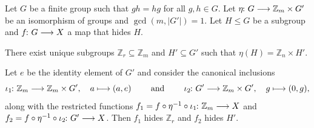 \documentclass[a4paper, oneside, 12pt]{amsart}
\begin{document}
\begin{corollary}\label{cor:abelian-vs-cyclic-hsps}
  Let \(G\) be a finite group such that \(gh=hg\) for all \(g,h\in G\).
  Let \(\eta \from G \to \mathbb{Z}_{m}\times G'\) be an isomorphism of groups and  \(\gcd(m, |G'|) = 1\).
  Let \(H \leq G\) be a subgroup and \(f \from G \to X\) a map that hides \(H\).
  \begin{thmlist}
    \item There exist unique subgroups \( \mathbb{Z}_{r} \subseteq \mathbb{Z}_{m}\) and \(H' \subseteq G'\) such that \(\eta(H) = \mathbb{Z}_{n} \times H'\).
    \item Let \(e\) be the identity element of \(G'\) and consider the canonical inclusions
    \begin{equation*}
      \iota_{1} \from \mathbb{Z}_{m} \to \mathbb{Z}_{m} \times G',\quad a \mapsto (a,e)\qquad \text{ and }\qquad
      \iota_{2} \from G' \to \mathbb{Z}_{m}\times G', \quad g \mapsto (0,g),
    \end{equation*}
    along with the restricted functions \(f_{1} = f \circ \eta^{-1} \circ \iota_{1} \from \mathbb{Z}_{m} \to X\) and \(f_{2} = f \circ \eta^{-1} \circ \iota_{2} \from G' \to X\).
    Then \(f_1\) hides \(\mathbb{Z}_r\) and \(f_2\) hides \(H'\).
  \end{thmlist}
\end{corollary}
\end{document}

